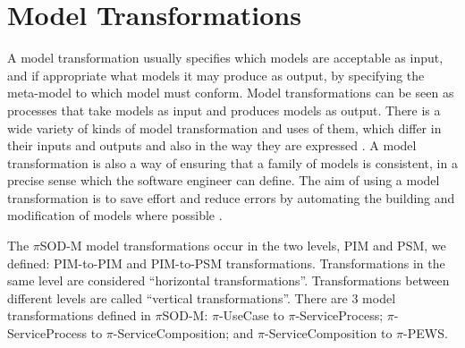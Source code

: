 \section{Model Transformations}
\label{sec:models-tranformation}

A model transformation usually specifies which models are acceptable as input,
and if appropriate what models it may produce as output, by specifying the
meta-model to which model must conform. Model transformations can be seen
as processes that take models as input and produces models as output. There
is a wide variety of kinds of model transformation and uses of them, which differ in their inputs and outputs
and also in the way they are expressed \cite{miller}. A model transformation is
also a way of ensuring that a family of models is consistent, in a precise sense
which the software engineer can define. The aim of using a model transformation
is to save effort and reduce errors by automating the building and modification
of models where possible \cite{atl_manual}.

The $\pi$SOD-M model transformations occur in the two levels, PIM and PSM,
we defined:  PIM-to-PIM and PIM-to-PSM transformations. Transformations in the
same level are considered ``horizontal transformations''. Transformations
between different levels are called ``vertical transformations''. There are 3
model transformations defined in $\pi$SOD-M: $\pi$-UseCase to
$\pi$-ServiceProcess; $\pi$-ServiceProcess to $\pi$-ServiceComposition; and
$\pi$-ServiceComposition to $\pi$-PEWS.

